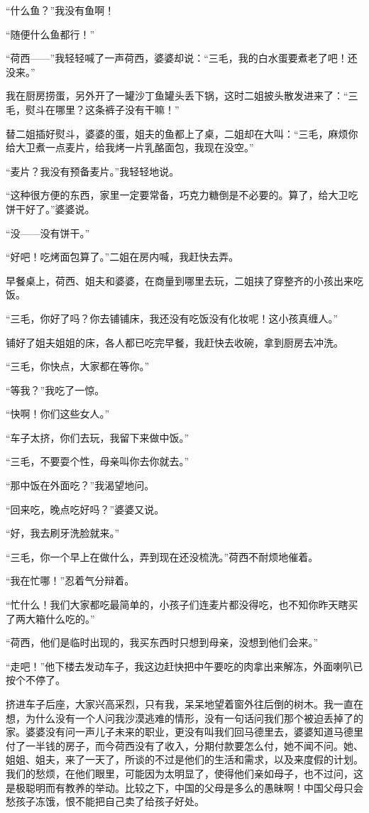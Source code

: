 \par “什么鱼？”我没有鱼啊！
\par “随便什么鱼都行！”
\par “荷西——”我轻轻喊了一声荷西，婆婆却说：“三毛，我的白水蛋要煮老了吧！还没来。”
\par 我在厨房捞蛋，另外开了一罐沙丁鱼罐头丢下锅，这时二姐披头散发进来了：“三毛，熨斗在哪里？这条裤子没有干嘛！”
\par 替二姐插好熨斗，婆婆的蛋，姐夫的鱼都上了桌，二姐却在大叫：“三毛，麻烦你给大卫煮一点麦片，给我烤一片乳酪面包，我现在没空。”
\par “麦片？我没有预备麦片。”我轻轻地说。
\par “这种很方便的东西，家里一定要常备，巧克力糖倒是不必要的。算了，给大卫吃饼干好了。”婆婆说。
\par “没——没有饼干。”
\par “好吧！吃烤面包算了。”二姐在房内喊，我赶快去弄。
\par 早餐桌上，荷西、姐夫和婆婆，在商量到哪里去玩，二姐挟了穿整齐的小孩出来吃饭。
\par “三毛，你好了吗？你去铺铺床，我还没有吃饭没有化妆呢！这小孩真缠人。”
\par 铺好了姐夫姐姐的床，各人都已吃完早餐，我赶快去收碗，拿到厨房去冲洗。
\par “三毛，你快点，大家都在等你。”
\par “等我？”我吃了一惊。
\par “快啊！你们这些女人。”
\par “车子太挤，你们去玩，我留下来做中饭。”
\par “三毛，不要耍个性，母亲叫你去你就去。”
\par “那中饭在外面吃？”我渴望地问。
\par “回来吃，晚点吃好吗？”婆婆又说。
\par “好，我去刷牙洗脸就来。”
\par “三毛，你一个早上在做什么，弄到现在还没梳洗。”荷西不耐烦地催着。
\par “我在忙哪！”忍着气分辩着。
\par “忙什么！我们大家都吃最简单的，小孩子们连麦片都没得吃，也不知你昨天瞎买了两大箱什么吃的。”
\par “荷西，他们是临时出现的，我买东西时只想到母亲，没想到他们会来。”
\par “走吧！”他下楼去发动车子，我这边赶快把中午要吃的肉拿出来解冻，外面喇叭已按个不停了。
\par 挤进车子后座，大家兴高采烈，只有我，呆呆地望着窗外往后倒的树木。我一直在想，为什么没有一个人问我沙漠逃难的情形，没有一句话问我们那个被迫丢掉了的家。婆婆没有问一声儿子未来的职业，更没有叫我们回马德里去，婆婆知道马德里付了一半钱的房子，而今荷西没有了收入，分期付款要怎么付，她不闻不问。她、姐姐、姐夫，来了一天了，所谈的不过是他们的生活和需求，以及来度假的计划。我们的愁烦，在他们眼里，可能因为太明显了，使得他们亲如母子，也不过问，这是极聪明而有教养的举动。比较之下，中国的父母是多么的愚昧啊！中国父母只会愁孩子冻饿，恨不能把自己卖了给孩子好处。
